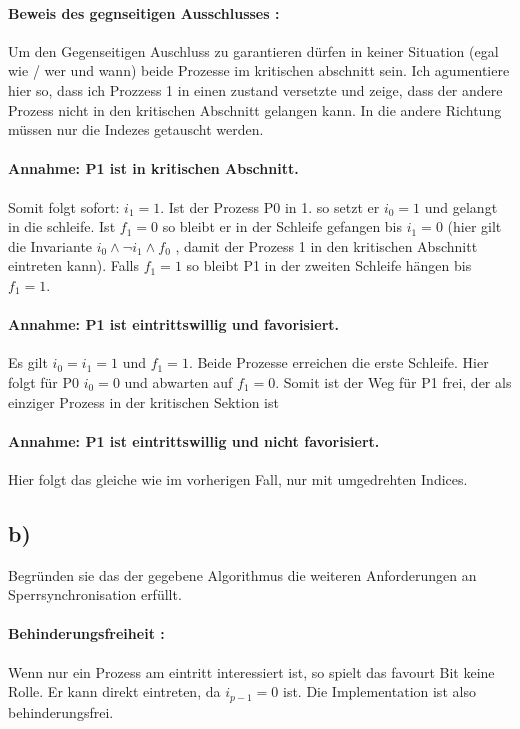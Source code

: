 \paragraph{Beweis des gegnseitigen Ausschlusses :} Um den Gegenseitigen Auschluss zu garantieren dürfen in keiner Situation (egal wie / wer und wann) beide Prozesse im kritischen abschnitt sein. Ich agumentiere hier so, dass ich Prozzess 1 in einen zustand versetzte und zeige, dass der andere Prozess nicht in den kritischen Abschnitt gelangen kann. In die andere Richtung müssen nur die Indezes getauscht werden.


\paragraph{ Annahme: P1 ist in kritischen Abschnitt.} Somit folgt sofort: $ i_{1} = 1$. Ist der Prozess P0 in 1. so setzt er $ i_{0} = 1$ und gelangt in die schleife. Ist $ f_{1} = 0$ so bleibt er in der Schleife gefangen bis $ i_{1} = 0$ (hier gilt die Invariante $ i_{0} \land \neg i_{1}  \land f_{0}$ , damit der Prozess 1 in den kritischen Abschnitt eintreten kann). Falls $ f_{1} = 1$ so bleibt P1 in der zweiten Schleife hängen bis $ f_{1} = 1$.

\paragraph{ Annahme: P1 ist eintrittswillig und favorisiert.} Es gilt $ i_{0} = i_{1} = 1$ und $ f_{1} = 1$. Beide Prozesse erreichen die erste Schleife. Hier folgt für P0 $ i_{0} = 0$ und abwarten auf $ f_{1} = 0$. Somit ist der Weg für P1 frei, der als einziger Prozess in der kritischen Sektion ist  


\paragraph{ Annahme: P1 ist eintrittswillig und nicht favorisiert.} Hier folgt das gleiche wie im vorherigen Fall, nur mit umgedrehten Indices.


\subsection*{ b) } Begründen sie das der gegebene Algorithmus die weiteren Anforderungen an Sperrsynchronisation erfüllt.

\paragraph{ Behinderungsfreiheit : } Wenn nur ein Prozess am eintritt interessiert ist, so spielt das favourt Bit keine Rolle. Er kann direkt eintreten, da $ i_{p - 1} = 0$ ist. Die Implementation ist also behinderungsfrei.

